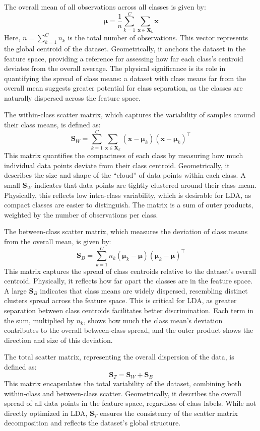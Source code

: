 \documentclass[12pt,a4paper]{article}
\begin{document}
The overall mean of all observations across all classes is given by:
\[
\boldsymbol{\mu} = \frac{1}{n} \sum_{k=1}^C \sum_{\mathbf{x} \in \mathbf{X}_k} \mathbf{x}
\]
Here, $n = \sum_{k=1}^C n_k$ is the total number of observations. This vector represents the global centroid of the dataset. Geometrically, it anchors the dataset in the feature space, providing a reference for assessing how far each class’s centroid deviates from the overall average. The physical significance is its role in quantifying the spread of class means: a dataset with class means far from the overall mean suggests greater potential for class separation, as the classes are naturally dispersed across the feature space.

The within-class scatter matrix, which captures the variability of samples around their class means, is defined as:
\[
\mathbf{S}_W = \sum_{k=1}^C \sum_{\mathbf{x} \in \mathbf{X}_k} (\mathbf{x} - \boldsymbol{\mu}_k)(\mathbf{x} - \boldsymbol{\mu}_k)^\top
\]
This matrix quantifies the compactness of each class by measuring how much individual data points deviate from their class centroid. Geometrically, it describes the size and shape of the ``cloud'' of data points within each class. A small $\mathbf{S}_W$ indicates that data points are tightly clustered around their class mean. Physically, this reflects low intra-class variability, which is desirable for LDA, as compact classes are easier to distinguish. The matrix is a sum of outer products, weighted by the number of observations per class.

The between-class scatter matrix, which measures the deviation of class means from the overall mean, is given by:
\[
\mathbf{S}_B = \sum_{k=1}^C n_k (\boldsymbol{\mu}_k - \boldsymbol{\mu})(\boldsymbol{\mu}_k - \boldsymbol{\mu})^\top
\]
This matrix captures the spread of class centroids relative to the dataset’s overall centroid. Physically, it reflects how far apart the classes are in the feature space. A large $\mathbf{S}_B$ indicates that class means are widely dispersed, resembling distinct clusters spread across the feature space. This is critical for LDA, as greater separation between class centroids facilitates better discrimination. Each term in the sum, multiplied by $n_k$, shows how much the class mean's deviation contributes to the overall between-class spread, and the outer product shows the direction and size of this deviation.

The total scatter matrix, representing the overall dispersion of the data, is defined as:
\[
\mathbf{S}_T = \mathbf{S}_W + \mathbf{S}_B
\]
This matrix encapsulates the total variability of the dataset, combining both within-class and between-class scatter. Geometrically, it describes the overall spread of all data points in the feature space, regardless of class labels. While not directly optimized in LDA, $\mathbf{S}_T$ ensures the consistency of the scatter matrix decomposition and reflects the dataset’s global structure.
\end{document}
